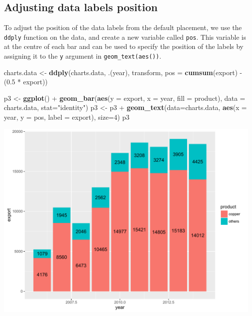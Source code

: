 \documentclass[]{article}
\newenvironment{Shaded}{\begin{snugshade}}{\end{snugshade}}
\newcommand{\KeywordTok}[1]{\textcolor[rgb]{0.13,0.29,0.53}{\textbf{{#1}}}}
\newcommand{\DataTypeTok}[1]{\textcolor[rgb]{0.13,0.29,0.53}{{#1}}}
\newcommand{\DecValTok}[1]{\textcolor[rgb]{0.00,0.00,0.81}{{#1}}}
\newcommand{\FloatTok}[1]{\textcolor[rgb]{0.00,0.00,0.81}{{#1}}}
\newcommand{\StringTok}[1]{\textcolor[rgb]{0.31,0.60,0.02}{{#1}}}
\newcommand{\NormalTok}[1]{{#1}}
\begin{document}
\subsection{Adjusting data labels
position}\label{adjusting-data-labels-position}

To adjust the position of the data labels from the default placement, we
use the \texttt{ddply} function on the data, and create a new variable
called \texttt{pos}. This variable is at the centre of each bar and can
be used to specify the position of the labels by assigning it to the
\texttt{y} argument in \texttt{geom\_text(aes())}.

\begin{Shaded}
\begin{Highlighting}[]
\NormalTok{charts.data <-}\StringTok{ }\KeywordTok{ddply}\NormalTok{(charts.data, .(year), transform, }\DataTypeTok{pos =} \KeywordTok{cumsum}\NormalTok{(export) -}\StringTok{ }\NormalTok{(}\FloatTok{0.5} \NormalTok{*}\StringTok{ }\NormalTok{export))}

\NormalTok{p3 <-}\StringTok{ }\KeywordTok{ggplot}\NormalTok{() +}\StringTok{ }\KeywordTok{geom_bar}\NormalTok{(}\KeywordTok{aes}\NormalTok{(}\DataTypeTok{y =} \NormalTok{export, }\DataTypeTok{x =} \NormalTok{year, }\DataTypeTok{fill =} \NormalTok{product), }\DataTypeTok{data =} \NormalTok{charts.data, }
                          \DataTypeTok{stat=}\StringTok{"identity"}\NormalTok{) }
\NormalTok{p3 <-}\StringTok{ }\NormalTok{p3 +}\StringTok{ }\KeywordTok{geom_text}\NormalTok{(}\DataTypeTok{data=}\NormalTok{charts.data, }\KeywordTok{aes}\NormalTok{(}\DataTypeTok{x =} \NormalTok{year, }\DataTypeTok{y =} \NormalTok{pos, }\DataTypeTok{label =} \NormalTok{export), }\DataTypeTok{size=}\DecValTok{4}\NormalTok{)}
\NormalTok{p3}
\end{Highlighting}
\end{Shaded}

\begin{center}\includegraphics{0_all_posts_pdf/bar_3-1} \end{center}
\end{document}

